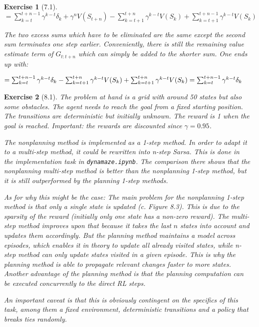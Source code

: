 \documentclass[a4paper]{scrartcl}
\theoremstyle{nonumberplain}
\newtheorem{ex}{Exercise}
\begin{document}
\begin{ex}[7.1]
\begin{math}
= \sum_{k=t}^{t+n-1} \gamma^{k-t} \delta_{k} + \gamma^n V(S_{t+n}) - \sum_{k=t+1}^{t+n} \gamma^{k-t} V(S_{k}) + \sum_{k=t+1}^{t+n-1} \gamma^{k-t} V(S_k)
\end{math}

The two excess sums which have to be eliminated are the same except the second sum terminates one step earlier. Conveniently, there is still the remaining value estimate term of $G_{t:t+n}$ which can simply be added to the shorter sum. One ends up with:

\begin{math}
= \sum_{k=t}^{t+n-1} \gamma^{k-t} \delta_{k} - \sum_{k=t+1}^{t+n} \gamma^{k-t} V(S_{k}) + \sum_{k=t+1}^{t+n} \gamma^{k-t} V(S_k)\\
= \sum_{k=t}^{t+n-1} \gamma^{k-t} \delta_{k}
\end{math}

\end{ex}

\begin{ex}[8.1]
The problem at hand is a grid with around 50 states but also some obstacles. The agent needs to reach the goal from a fixed starting position. The transitions are deterministic but initially unknown. The reward is 1 when the goal is reached. Important: the rewards are discounted since $\gamma=0.95$.

The nonplanning method is implemented as a 1-step method. In order to adapt it to a multi-step method, it could be rewritten into n-step Sarsa. This is done in the implementation task in \texttt{dynamaze.ipynb}. The comparison there shows that the nonplanning multi-step method is better than the nonplanning 1-step method, but it is still outperformed by the planning 1-step methods.

As for why this might be the case: The main problem for the nonplanning 1-step method is that only a single state is updated (c. Figure 8.3). This is due to the sparsity of the reward (initially only one state has a non-zero reward). The multi-step method improves upon that because it takes the last $n$ states into account and updates them accordingly. But the planning method maintains a model across episodes, which enables it in theory to update all already visited states, while n-step method can only update states visited in a given episode. This is why the planning method is able to propagate relevant changes faster to more states. Another advantage of the planning method is that the planning computation can be executed concurrently to the direct RL steps.

An important caveat is that this is obviously contingent on the specifics of this task, among them a fixed environment, deterministic transitions and a policy that breaks ties randomly.
\end{ex}
\end{document}
